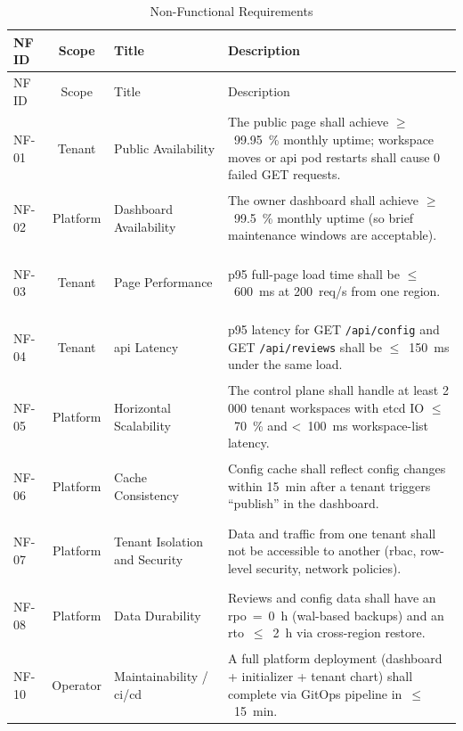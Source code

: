 \documentclass[11pt, a4paper, oneside, listof=totoc]{scrartcl}
\begin{document}
                \renewcommand{\arraystretch}{1.5}
                \begin{longtable}{@{}lcp{4cm}P{8cm}@{}}
                    \toprule
                    NF ID & Scope & Title & Description \\
                    \midrule
                    \endfirsthead

                    \toprule
                    NF ID & Scope & Title & Description \\
                    \midrule
                    \endhead

                    \bottomrule
                    \endfoot

                    \bottomrule
                    \caption{Non-Functional Requirements}\label{tab:nfr}
                    \endlastfoot

                    \hypertarget{nf1}{NF-01} & Tenant & Public Availability & The public page shall achieve $\geq$~99.95~\% monthly uptime; workspace moves or \gls{api} pod restarts shall cause 0 failed GET requests. \\
                    \hypertarget{nf2}{NF-02} & Platform & Dashboard Availability & The owner dashboard shall achieve $\geq$~99.5~\% monthly uptime (so brief maintenance windows are acceptable). \\
                    \hypertarget{nf3}{NF-03} & Tenant & Page Performance & p95 full-page load time shall be $\leq$~600~ms at 200~req/s from one region. \\
                    \hypertarget{nf4}{NF-04} & Tenant & \gls{api} Latency & p95 latency for GET \texttt{/api/config} and GET \texttt{/api/reviews} shall be $\leq$~150~ms under the same load. \\
                    \hypertarget{nf5}{NF-05} & Platform & Horizontal Scalability & The control plane shall handle at least 2 000 tenant workspaces with etcd IO $\leq$~70~\% and <~100~ms workspace-list latency. \\
                    \hypertarget{nf6}{NF-06} & Platform & Cache Consistency & Config cache shall reflect config changes within 15~min after a tenant triggers \enquote{publish} in the dashboard. \\
                    \hypertarget{nf7}{NF-07} & Platform & Tenant Isolation and Security & Data and traffic from one tenant shall not be accessible to another (\gls{rbac}, row-level security, network policies). \\
                    \hypertarget{nf8}{NF-08} & Platform & Data Durability & Reviews and config data shall have an \gls{rpo}~=~0~h (\gls{wal}-based backups) and an \gls{rto}~$\leq$~2~h via cross-region restore. \\
                    \hypertarget{nf10}{NF-10} & Operator & Maintainability / \gls{ci}/\gls{cd} & A full platform deployment (dashboard + initializer + tenant chart) shall complete via GitOps pipeline in~$\leq$~15~min. \\

                \end{longtable}
\end{document}
